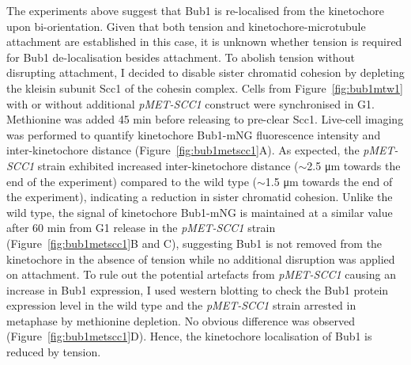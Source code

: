The experiments above suggest that Bub1 is re-localised from the kinetochore upon bi-orientation. Given that both tension and kinetochore-microtubule attachment are established in this case, it is unknown whether tension is required for Bub1 de-localisation besides attachment. To abolish tension without disrupting attachment, I decided to disable sister chromatid cohesion by depleting the kleisin subunit Scc1 of the cohesin complex. Cells from Figure~\ref{fig:bub1mtw1} with or without additional \textit{pMET-SCC1} construct were synchronised in G1. Methionine was added 45 \si{\minute} before releasing to pre-clear Scc1. Live-cell imaging was performed to quantify kinetochore Bub1-mNG fluorescence intensity and inter-kinetochore distance (Figure~\ref{fig:bub1metscc1}A). As expected, the \textit{pMET-SCC1} strain exhibited increased inter-kinetochore distance ($\sim$2.5 \si{\micro\metre} towards the end of the experiment) compared to the wild type ($\sim$1.5 \si{\micro\metre} towards the end of the experiment), indicating a reduction in sister chromatid cohesion. Unlike the wild type, the signal of kinetochore Bub1-mNG is maintained at a similar value after 60 \si{\minute} from G1 release in the \textit{pMET-SCC1} strain (Figure~\ref{fig:bub1metscc1}B and C), suggesting Bub1 is not removed from the kinetochore in the absence of tension while no additional disruption was applied on attachment. To rule out the potential artefacts from \textit{pMET-SCC1} causing an increase in Bub1 expression, I used western blotting to check the Bub1 protein expression level in the wild type and the \textit{pMET-SCC1} strain arrested in metaphase by methionine depletion. No obvious difference was observed (Figure~\ref{fig:bub1metscc1}D). Hence, the kinetochore localisation of Bub1 is reduced by tension. 

